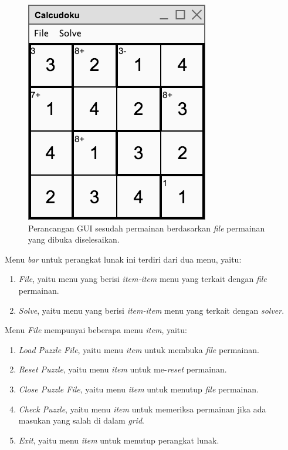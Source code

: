 \begin{figure}
\centering
\captionsetup{justification=centering}
\includegraphics[scale=0.5]{Gambar/Perancangan/PerancanganGUI3.png}
\caption[Perancangan GUI sesudah permainan berdasarkan \textit{file} permainan yang dibuka diselesaikan.]{Perancangan GUI sesudah permainan berdasarkan \textit{file} permainan yang dibuka diselesaikan.}
\label{fig:perancangangui3}
\end{figure}

Menu \textit{bar} untuk perangkat lunak ini terdiri dari dua menu, yaitu:
\begin{enumerate}
\item \textit{File}, yaitu menu yang berisi \textit{item-item} menu yang terkait dengan \textit{file} permainan.
\item \textit{Solve}, yaitu menu yang berisi \textit{item-item} menu yang terkait dengan \textit{solver}.
\end{enumerate}

Menu \textit{File} mempunyai beberapa menu \textit{item}, yaitu:
\begin{enumerate}
\item \textit{Load Puzzle File}, yaitu menu \textit{item} untuk membuka \textit{file} permainan.
\item \textit{Reset Puzzle}, yaitu menu \textit{item} untuk me-\textit{reset} permainan.
\item \textit{Close Puzzle File}, yaitu menu \textit{item} untuk menutup \textit{file} permainan.
\item \textit{Check Puzzle}, yaitu menu \textit{item} untuk memeriksa permainan jika ada masukan yang salah di dalam \textit{grid}.
\item \textit{Exit}, yaitu menu \textit{item} untuk menutup perangkat lunak.
\end{enumerate}

